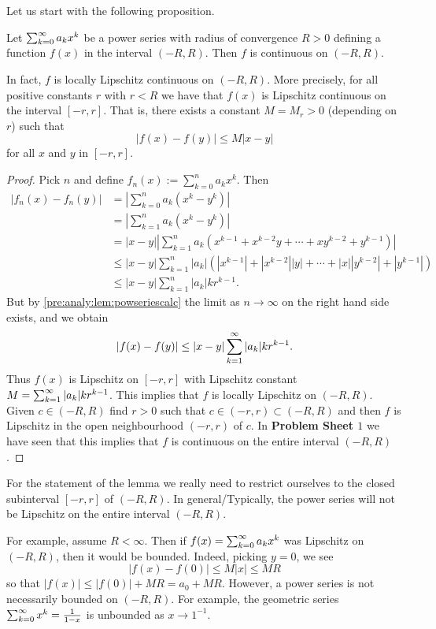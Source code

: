 \documentclass[10pt, a4paper]{article}
\newcommand{\infsumo}{\infsum[k = 0]}
\begin{document}
Let us start with the following proposition.
\begin{proposition}\label{pre:analy:prop:powserarecont}
    Let $\infsumo a_kx ^ k$ be a power series with radius of convergence $R > 0$ defining a function $f(x)$ in the interval $(-R, R)$.
    Then $f$ is continuous on $(-R, R)$.

    In fact,
    $f$ is locally Lipschitz continuous on $(-R, R)$.
    More precisely,
    for all positive constants $r$ with $r < R$ we have that $f(x)$ is Lipschitz continuous on the interval $[-r, r]$.
    That is,
    there exists a constant $M = M_r > 0$
    (depending on $r$)
    such that
    \[
    |f(x) - f(y)| \leq M|x - y|
    \]
    for all $x$ and $y$ in $[-r, r]$.
    \begin{proof}
        Pick $n$ and define $f_n(x) := \sum_{k = 0}^{n}a_kx ^ k$.
        Then
        \begin{align*}
            |f_n(x) - f_n(y)| &= \left|\sum_{k = 0}^{n}a_k(x ^ k - y ^ k)\right| \\
            &= \left|\sum_{k = 1}^{n}a_k(x ^ k - y ^ k)\right| \\
            &= |x - y|\left|\sum_{k = 1}^{n}a_k\left(x ^ {k - 1} + x ^ {k - 2}y + \dotsi + xy ^ {k - 2} + y ^ {k - 1}\right)\right| \\
            &\leq |x - y|\sum_{k = 1}^{n}|a_k|\left(|x ^ {k - 1}| + |x ^ {k - 2}||y| + \dotsi + |x||y ^ {k - 2}| + |y ^ {k - 1}|\right) \\
            &\leq |x - y|\sum_{k = 1}^{n}|a_k|kr ^ {k - 1}.
        \end{align*}
        But by \autoref{pre:analy:lem:powseriescalc} the limit as $n \rightarrow \infty$ on the right hand side exists,
        and we obtain
        \[
        |f(x) - f(y)| \leq |x - y|\sum_{k = 1}^{\infty}|a_k|kr ^ {k - 1}.
        \]
        Thus $f(x)$ is Lipschitz on $[-r, r]$ with Lipschitz constant $M = \sum_{k = 1}^{\infty}|a_k|kr ^ {k - 1}$.
        This implies that $f$ is locally Lipschitz on $(-R, R)$.
        Given $c \in (-R, R)$ find $r > 0$ such that $c \in (-r, r) \subset (-R, R)$ and then $f$ is Lipschitz in the open neighbourhood $(-r, r)$ of $c$.
        In \textbf{Problem Sheet $1$} we have seen that this implies that $f$ is continuous on the entire interval $(-R, R)$.
    \end{proof}
\end{proposition}

\begin{remark}
    For the statement of the lemma we really need to restrict ourselves to the closed subinterval $[-r, r]$ of $(-R, R)$.
    In general/Typically,
    the power series will not be Lipschitz on the entire interval $(-R, R)$.
    
    For example,
    assume $R < \infty$.
    Then if $f(x) = \infsumo a_kx ^ k$ was Lipschitz on $(-R, R)$,
    then it would be bounded.
    Indeed,
    picking $y = 0$,
    we see
    \[
    |f(x) - f(0)| \leq M|x| \leq MR
    \]
    so that $|f(x)| \leq |f(0)| + MR = a_0 + MR$.
    However,
    a power series is not necessarily bounded on $(-R, R)$.
    For example,
    the geometric series $\infsumo x ^ k = \frac{1}{1 - x}$ is unbounded as $x \rightarrow 1 ^ {-1}$.
\end{remark}
\end{document}
